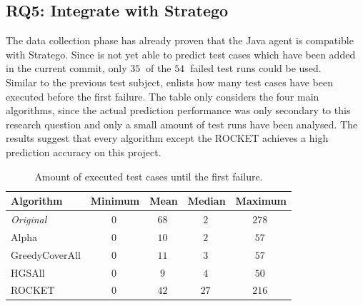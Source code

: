 \clearpage

\subsection{RQ5: Integrate \velocity{} with Stratego}
The data collection phase has already proven that the Java agent is compatible with Stratego. Since \velocity{} is not yet able to predict test cases which have been added in the current commit, only $\SI{35}{}$ of the $\SI{54}{}$ failed test runs could be used.\\

\noindent Similar to the previous test subject,  enlists how many test cases have been executed before the first failure. The table only considers the four main algorithms, since the actual prediction performance was only secondary to this research question and only a small amount of test runs have been analysed. The results suggest that every algorithm except the ROCKET achieves a high prediction accuracy on this project.

\begin{table}[h]
	\centering
	\begin{tabularx}{\textwidth}{|X||c|c|c|c|}
		\hline
		\textbf{Algorithm} & \textbf{Minimum} & \textbf{Mean} & \textbf{Median} & \textbf{Maximum}\\
		
		\hline
		
		\emph{Original} & $\SI{0}{}$ & $\SI{68}{}$ & $\SI{2}{}$ & $\SI{278}{}$\\
		
		\hline
		
		Alpha & $\SI{0}{}$ & $\SI{10}{}$ & $\SI{2}{}$ & $\SI{57}{}$\\
		
		\hline
		
		GreedyCoverAll & $\SI{0}{}$ & $\SI{11}{}$ & $\SI{3}{}$ & $\SI{57}{}$\\
		
		\hline
		
		HGSAll & $\SI{0}{}$ & $\SI{9}{}$ & $\SI{4}{}$ & $\SI{50}{}$\\
		
		\hline
		
		ROCKET & $\SI{0}{}$ & $\SI{42}{}$ & $\SI{27}{}$ & $\SI{216}{}$\\
		
		\hline
	\end{tabularx}
	\caption{Amount of executed test cases until the first failure.}
	\label{tbl:rq5-first-failure}
\end{table}

